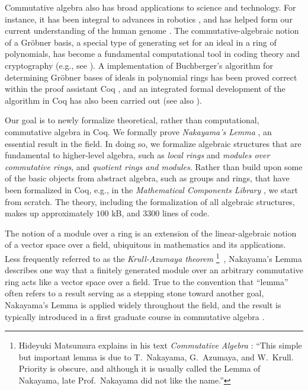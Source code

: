 \documentclass{article}
\begin{document}
Commutative algebra also has broad applications to science and technology. For
instance, it has been integral to advances in robotics \cite{cox-little-oshea},
and has helped form our current understanding of the human genome
\cite{genetic-algebra}. The commutative-algebraic notion of a Gr\"{o}bner
basis, a special type of generating set for an ideal in a ring of polynomials,
has become a fundamental computational tool in coding theory and cryptography
(e.g., see  \cite{grobner-bases-cryptography}). A implementation of
Buchberger's algorithm \cite{buchberger} for determining Gr\"obner bases of
ideals in polynomial rings has been proved correct within the proof assistant
Coq \cite{the_coq_development_team_2019_3476303,thery-buchberger}, and an
integrated formal development of the algorithm in Coq has also been carried out
\cite{persson2001integrated} (see also \cite{grobner-type-theory}). 

Our goal is to newly formalize theoretical, rather than computational,
commutative algebra in Coq. We formally prove \emph{Nakayama's Lemma}
\cite{nakayama-1951, azumaya}, an essential result in the field. In doing so,
we formalize algebraic structures that are fundamental to higher-level algebra,
such as \emph{local rings} and \emph{modules over commutative rings}, and
\emph{quotient rings and modules}. Rather than build upon some of the basic
objects from abstract algebra, such as groups and rings, that have been
formalized in Coq, e.g., in the \emph{Mathematical Components Library}
\cite{mathcomp}, we start from scratch.
The theory, including the formalization of all algebraic structures, makes up
approximately $100$ kB, and 3300 lines of code.
 
The notion of a module over a ring is an extension of the linear-algebraic
notion of a vector space over a field, ubiquitous in mathematics and its
applications. Less frequently referred to as the \emph{Krull-Azumaya theorem}
\footnote{Hideyuki Matsumura explains in his text \emph{Commutative Algebra}
  \cite{matsumura}: ``{This simple but important lemma is due to T.\ Nakayama,
  G.\ Azumaya, and W.\ Krull. Priority is obscure, and although it is usually
  called the Lemma of Nakayama, late Prof.\  Nakayama did not like the
  name.''}}
\,\cite{nagata}, Nakayama's Lemma describes one way that a finitely generated
module over an arbitrary commutative ring acts like a vector space over a
field. True to the convention that ``lemma'' often refers to a result serving
as a stepping stone toward another goal, Nakayama's Lemma is applied widely
throughout the field, and the result is typically introduced in a first
graduate course in commutative algebra \cite{atiyah-macdonald, matsumura,
eisenbud}.
\end{document}
